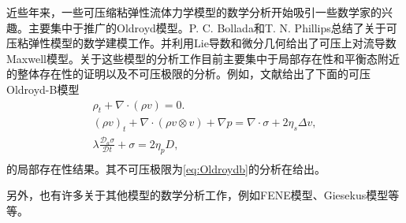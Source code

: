 近些年来，一些可压缩粘弹性流体力学模型的数学分析开始吸引一些数学家的兴趣。主要集中于推广的Oldroyd模型。P. C. Bollada和T. N. Phillips总结了关于可压粘弹性模型的数学建模工作\cite{bollada2012mathematical}。并利用Lie导数和微分几何给出了可压上对流导数Maxwell模型。关于这些模型的分析工作目前主要集中于局部存在性和平衡态附近的整体存在性的证明以及不可压极限的分析\cite{zhang2012global,fang2013strong,fang2014incompressible,matuvsuu1999existence,fang2013strong,barrett2016existence,salloum2011local}。例如，文献\cite{fang2013strong}给出了下面的可压Oldroyd-B模型
\begin{subequations}
	\begin{align*}
	\rho_t + \nabla \cdot (\rho v) = 0. \\
	(\rho v)_t + \nabla \cdot (\rho v \otimes v)  + \nabla p = \nabla \cdot \sigma + 2 \eta_s \Delta v, \\
	\lambda \frac{\mathcal{D}_a \sigma}{\mathcal{D} t} + \sigma = 2 \eta_p D, \\
	\end{align*}
\end{subequations}
的局部存在性结果。其不可压极限为\eqref{eq:Oldroydb}的分析在\cite{fang2014incompressible}给出。

另外，也有许多关于其他模型的数学分析工作，例如FENE模型\cite{masmoudi2008well,zhang2006local,jourdain2004existence,liu2008boundary}、Giesekus模型\cite{renardy1984existence}等等。

